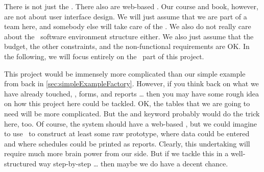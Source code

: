 There is not just the \db.
There also are web-based .
Our course and book, however, are not about user interface design.
We will just assume that we are part of a team here, and somebody else will take care of the .
We also do not really care about the \docker\ software environment structure either.
We also just assume that the budget, the other constraints, and the non-functional requirements are OK.
In the following, we will focus entirely on the \db\ part of this project.

This project would be immensely more complicated than our simple example from back in \cref{sec:simpleExampleFactory}.
However, if you think back on what we have already touched, \sql, forms, and reports {\dots} then you may have some rough idea on how this project here could be tackled.
OK, the tables that we are going to need will be more complicated.
But the  and  keyword probably would do the trick here, too.
Of course, the system should have a web-based , but we could imagine to use \libreofficeBase\ to construct at least some raw prototype, where data could be entered and where schedules could be printed as reports.
Clearly, this undertaking will require much more brain power from our side.
But if we tackle this in a well-structured way step-by-step {\dots} then maybe we do have a decent chance.%
\endhsection%
%
\endhsection%
\endhsection%
%
